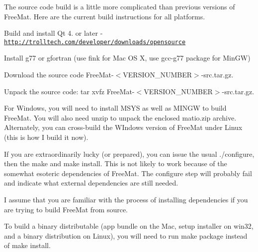 The source code build is a little more complicated than previous versions of Free\-Mat. Here are the current build instructions for all platforms. 
\begin{DoxyEnumerate}
\item Build and install Qt 4. or later -\/ {\ttfamily \href{http://trolltech.com/developer/downloads/opensource}{\tt http\-://trolltech.\-com/developer/downloads/opensource}}  
\item Install g77 or gfortran (use fink for Mac O\-S X, use {\ttfamily gcc-\/g77} package for Min\-G\-W)  
\item Download the source code {\ttfamily Free\-Mat-\/$<$V\-E\-R\-S\-I\-O\-N\-\_\-\-N\-U\-M\-B\-E\-R$>$-\/src.\-tar.\-gz}.  
\item Unpack the source code\-: {\ttfamily tar xvfz Free\-Mat-\/$<$V\-E\-R\-S\-I\-O\-N\-\_\-\-N\-U\-M\-B\-E\-R$>$-\/src.\-tar.\-gz}.  
\item For Windows, you will need to install M\-S\-Y\-S as well as M\-I\-N\-G\-W to build Free\-Mat. You will also need unzip to unpack the enclosed matio.\-zip archive. Alternately, you can cross-\/build the W\-Indows version of Free\-Mat under Linux (this is how I build it now).  
\item If you are extraordinarily lucky (or prepared), you can issue the usual ./configure, then the make and make install. This is not likely to work because of the somewhat esoteric dependencies of Free\-Mat. The configure step will probably fail and indicate what external dependencies are still needed.  
\item I assume that you are familiar with the process of installing dependencies if you are trying to build Free\-Mat from source.  
\end{DoxyEnumerate}To build a binary distributable (app bundle on the Mac, setup installer on win32, and a binary distribution on Linux), you will need to run {\ttfamily make package} instead of {\ttfamily make install}. 